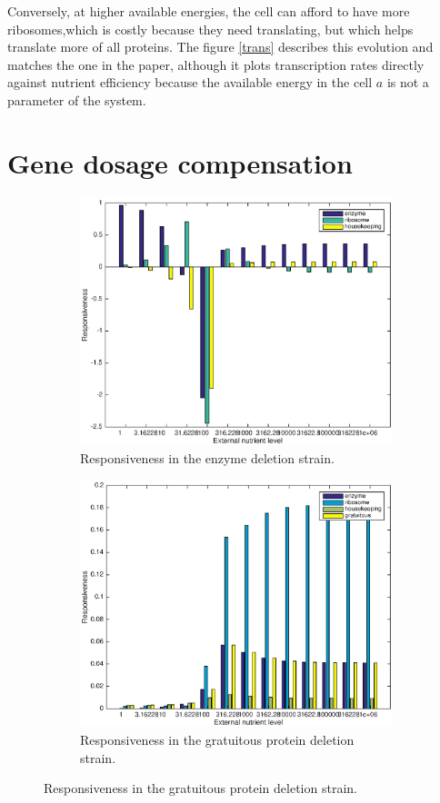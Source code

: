 \documentclass[a4paper]{article}
\begin{document}
Conversely, at higher available energies, the cell can afford to have more ribosomes,which is costly because they need translating, but which helps translate more of all proteins.
The figure \ref{trans} describes this evolution and matches the one in the paper, although it plots transcription rates directly against nutrient efficiency because the available energy in the cell $a$ is not a parameter of the system.

\section{Gene dosage compensation}

\begin{figure}[h]

\begin{subfigure}{0.5\textwidth}
\includegraphics[width=\textwidth]{enzdel.eps}
\caption{Responsiveness in the enzyme deletion strain.}
\label{enzdel}
\end{subfigure}
\begin{subfigure}{0.5\textwidth}
\includegraphics[width=\textwidth]{gratdel.eps}
\caption{Responsiveness in the gratuitous protein deletion strain.}
\label{gratdel}
\end{subfigure}


\end{figure}
\end{document}
